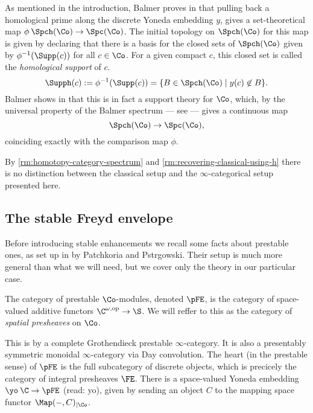 As mentioned in the introduction, Balmer proves in \cite[3.3]{balmer_2019} that pulling back a homological prime along the discrete Yoneda embedding $y$, gives a set-theoretical map $\phi\: \Spch(\Co)\to \Spc(\Co)$. The initial topology on $\Spch(\Co)$ for this map is given by declaring that there is a basis for the closed sets of $\Spch(\Co)$ given by $\phi^{-1}(\Supp(c))$ for all $c\in \Co$. For a given compact $c$, this closed set is called the \emph{homological support} of $c$. 
\[\Supph(c) := \phi^{-1}(\Supp(c)) = \{B\in \Spch(\Co)\mid y(c)\not\in B\}.\]
Balmer shows in \cite{balmer_2020} that this is in fact a support theory for $\Co$, which, by the universal property of the Balmer spectrum --- see \cite[3.2]{balmer_2005} --- gives a continuous map 
\[\Spch(\Co) \to \Spc(\Co),\]
coinciding exactly with the comparison map $\phi$. 

By \cref{rm:homotopy-category-spectrum} and \cref{rm:recovering-classical-using-h} there is no distinction between the classical setup and the $\infty$-categorical setup presented here.












\subsection{The stable Freyd envelope}

Before introducing stable enhancements we recall some facts about prestable ones, as set up in \cite{patchkoria-pstragowski_2021} by Patchkoria and Pstr\a{}gowski. Their setup is much more general than what we will need, but we cover only the theory in our particular case. 

\begin{definition}
    The category of prestable $\Co$-modules, denoted $\pFE$, is the category of space-valued additive functors $\C^{\omega, \mathrm{op}} \to \S$. We will reffer to this as the category of \emph{spatial presheaves} on $\Co$. 
\end{definition}

This is by \cite[C.1.5.9, C.1.5.10]{lurie_SAG} a complete Grothendieck prestable $\infty$-category. It is also a presentably symmetric monoidal $\infty$-category via Day convolution. The heart (in the prestable sense) of $\pFE$ is the full subcategory of discrete objects, which is precicely the category of integral presheaves $\FE$. There is a space-valued Yoneda embedding $\yo\: \C \to \pFE$ (read: yo), given by sending an object $C$ to the mapping space functor $\Map(-,C)_{\mid \Co}$. 

